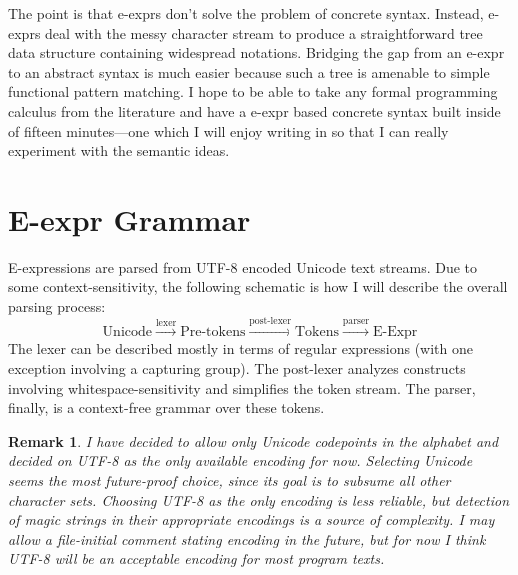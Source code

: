 \documentclass[11pt]{article} %
\newtheorem*{remark}{Remark}
\begin{document}
The point is that e-exprs don't solve the problem of concrete syntax.
Instead, e-exprs deal with the messy character stream to produce a straightforward tree data structure containing widespread notations.
Bridging the gap from an e-expr to an abstract syntax is much easier because such a tree is amenable to simple functional pattern matching.
I hope to be able to take any formal programming calculus from the literature and have a e-expr based concrete syntax built inside of fifteen minutes---one which I will enjoy writing in so that I can really experiment with the semantic ideas.

\section{E-expr Grammar}

E-expressions are parsed from UTF-8 encoded Unicode text streams.
Due to some context-sensitivity, the following schematic is how I will describe the overall parsing process:
$$\text{Unicode}
  \xrightarrow{\text{lexer}} \text{Pre-tokens}
  \xrightarrow{\text{post-lexer}} \text{Tokens}
  \xrightarrow{\text{parser}} \text{E-Expr}
$$
The lexer can be described mostly in terms of regular expressions (with one exception involving a capturing group).
The post-lexer analyzes constructs involving whitespace-sensitivity and simplifies the token stream.
The parser, finally, is a context-free grammar over these tokens.

\begin{remark}
I have decided to allow only Unicode codepoints in the alphabet and decided on UTF-8 as the only available encoding for now.
Selecting Unicode seems the most future-proof choice, since its goal is to subsume all other character sets.
Choosing UTF-8 as the only encoding is less reliable, but detection of magic strings in their appropriate encodings is a source of complexity.
I may allow a file-initial comment stating encoding in the future, but for now I think UTF-8 will be an acceptable encoding for most program texts.
\end{remark}

\newcommand*{\literal}[1]{\texttt{'{#1}'}}
\newcommand*{\notcharclass}[1]{\mathopen{\lnot[\mathord:\;} #1 \mathclose{\;\mathord:]}}
\newcommand*{\charclass}[1]{\mathopen{[\mathord:\;} #1 \mathclose{\;\mathord:]}}
\newcommand*{\charrange}[2]{\literal{#1}\text{--}\literal{#2}}
\end{document}
